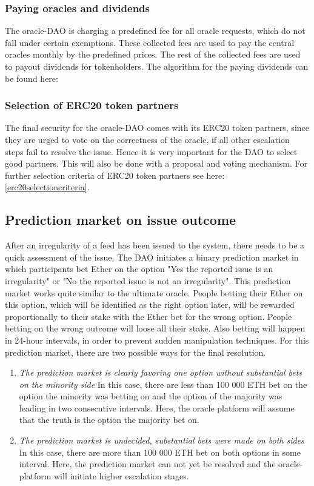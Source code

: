 \documentclass[a4paper]{article}
\begin{document}
\subsubsection{Paying oracles and dividends}
The oracle-DAO is charging a predefined fee for all oracle requests, which do not fall under certain exemptions. These collected fees are used to pay the central oracles monthly by the predefined prices. The rest of the collected fees are used to payout dividends for tokenholders. The algorithm for the paying dividends can be found here:
\cite{div}

\subsubsection{Selection of ERC20 token partners}
The final security for the oracle-DAO comes with its ERC20 token partners, since they are urged to vote on the correctness of the oracle, if all other escalation steps fail to resolve the issue. Hence it is very important for the DAO to select good partners. This will also be done with a proposal and voting mechanism. For further selection criteria of ERC20 token partners see here: \ref{erc20selectioncriteria}.

\subsection{Prediction market on issue outcome}
\label{predictionmarket}
After an irregularity of a feed has been issued to the system, there needs to be a quick assessment of the issue. The DAO initiates a binary prediction market in which participants bet Ether on the option "Yes the reported issue is an irregularity" or "No the reported issue is not an irregularity".
This prediction market works quite similar to the ultimate oracle. People betting their Ether on this option, which will be identified as the right option later, will be rewarded proportionally to their stake with the Ether bet for the wrong option. People betting on the wrong outcome will loose all their stake. Also betting will happen in 24-hour intervals, in order to prevent sudden manipulation techniques. 
For this prediction market, there are two possible ways for the final resolution. 
\begin{enumerate}
\item \textit{The prediction market is clearly favoring one option without substantial bets on the minority side}
In this case, there are less than 100 000 ETH bet on the option the minority was betting on and the option of the majority was leading in two consecutive intervals. Here, the oracle platform will assume that the truth is the option the majority bet on. 


\item \textit{The prediction market is undecided, substantial bets were made on both sides}
In this case, there are more than 100 000 ETH bet on both options in some interval.
Here, the prediction market can not yet be resolved and the oracle-platform will initiate higher escalation stages.
\end{enumerate}
\end{document}
